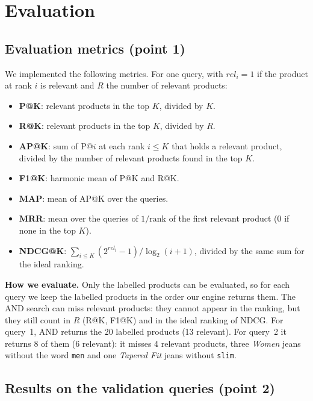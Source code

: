 \documentclass[11pt,a4paper]{article}
\begin{document}
\section{Evaluation}

\subsection{Evaluation metrics (point 1)}
We implemented the following metrics. For one query, with $rel_i = 1$ if the product
at rank $i$ is relevant and $R$ the number of relevant products:
\begin{itemize}
  \item \textbf{P@K}: relevant products in the top $K$, divided by $K$.
  \item \textbf{R@K}: relevant products in the top $K$, divided by $R$.
  \item \textbf{AP@K}: sum of P@$i$ at each rank $i \le K$ that holds a relevant product, divided by the number of relevant products found in the top $K$.
  \item \textbf{F1@K}: harmonic mean of P@K and R@K.
  \item \textbf{MAP}: mean of AP@K over the queries.
  \item \textbf{MRR}: mean over the queries of $1/\text{rank}$ of the first relevant product (0 if none in the top $K$).
  \item \textbf{NDCG@K}: $\sum_{i \le K} (2^{rel_i}-1)/\log_2(i+1)$, divided by the same sum for the ideal ranking.
\end{itemize}

\textbf{How we evaluate.} Only the labelled products can be evaluated, so for each query we keep the labelled products
in the order our engine returns them. The AND search can miss relevant products: they cannot appear in the ranking, but
they still count in $R$ (R@K, F1@K) and in the ideal ranking of NDCG. For query~1, AND returns the 20 labelled products (13 relevant). For query~2 it
returns 8 of them (6 relevant): it misses 4 relevant products, three \emph{Women} jeans without the word \texttt{men}
and one \emph{Tapered Fit} jeans without \texttt{slim}.

\subsection{Results on the validation queries (point 2)}
\end{document}
